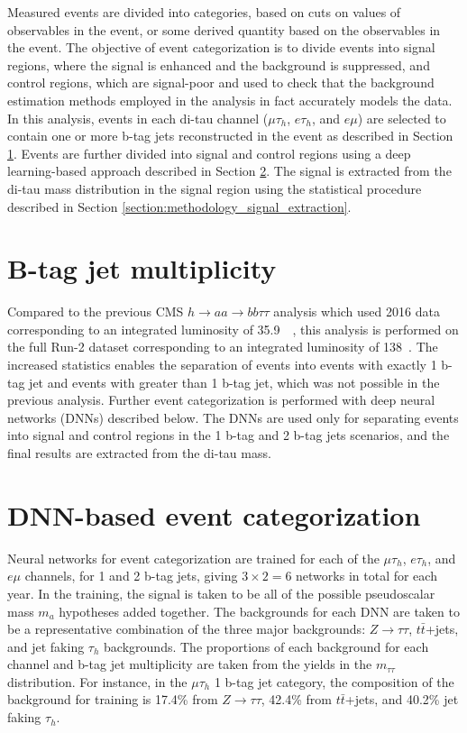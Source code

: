 Measured events are divided into categories, based on cuts on values of observables in the event, or some derived quantity based on the observables in the event. The objective of event categorization is to divide events into signal regions, where the signal is enhanced and the background is suppressed, and control regions, which are signal-poor and used to check that the background estimation methods employed in the analysis in fact accurately models the data. In this analysis, events in each di-tau channel ($\mu\tau_{h}$, $e\tau_{h}$, and $e\mu$) are selected to contain one or more b-tag jets reconstructed in the event as described in Section \ref{section:event-categorization-b-tag-jet}. Events are further divided into signal and control regions using a deep learning-based approach described in Section \ref{section:DNN-event-categorization}. The signal is extracted from the di-tau mass distribution in the signal region using the statistical procedure described in Section \ref{section:methodology_signal_extraction}.

\section{B-tag jet multiplicity}
\label{section:event-categorization-b-tag-jet}
Compared to the previous CMS $h \rightarrow aa \rightarrow bb\tau\tau$ analysis which used 2016 data corresponding to an integrated luminosity of 35.9~\fbinv~\cite{CMS-HIG-17-024}, this analysis is performed on the full Run-2 dataset corresponding to an integrated luminosity of 138~\fbinv. The increased statistics enables the separation of events into events with exactly 1 b-tag jet and events with greater than 1 b-tag jet, which was not possible in the previous analysis. Further event categorization is performed with deep neural networks (DNNs) described below. The DNNs are used only for separating events into signal and control regions in the 1 b-tag and 2 b-tag jets scenarios, and the final results are extracted from the di-tau mass.

\section{DNN-based event categorization}
\label{section:DNN-event-categorization}
Neural networks for event categorization are trained for each of the $\mu\tau_{h}$, $e\tau_{h}$, and $e\mu$ channels, for 1 and 2 b-tag jets, giving $3 \times 2 = 6$ networks in total for each year. In the training, the signal is taken to be all of the possible pseudoscalar mass $m_{a}$ hypotheses added together. The backgrounds for each DNN are taken to be a representative combination of the three major backgrounds: $Z \rightarrow \tau\tau$, $t\bar{t}$+jets, and jet faking $\tau_{h}$ backgrounds. The proportions of each background for each channel and b-tag jet multiplicity are taken from the yields in the $m_{\tau\tau}$ distribution. For instance, in the $\mu\tau_{h}$ 1 b-tag jet category, the composition of the background for training is 17.4\% from $Z \rightarrow \tau\tau$, 42.4\% from $t\bar{t}$+jets, and 40.2\% jet faking $\tau_{h}$. 

